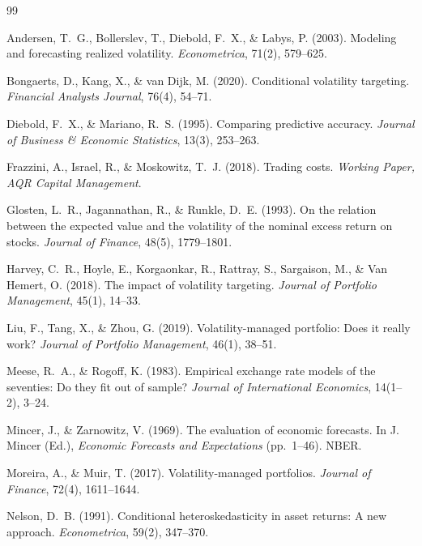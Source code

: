 \documentclass[12pt, a4paper]{article}
\begin{document}

\begin{thebibliography}{99}

Andersen, T.~G., Bollerslev, T., Diebold, F.~X., \& Labys, P. (2003).
Modeling and forecasting realized volatility.
\textit{Econometrica}, 71(2), 579--625.

Bongaerts, D., Kang, X., \& van Dijk, M. (2020).
Conditional volatility targeting.
\textit{Financial Analysts Journal}, 76(4), 54--71.

Diebold, F.~X., \& Mariano, R.~S. (1995).
Comparing predictive accuracy.
\textit{Journal of Business \& Economic Statistics}, 13(3), 253--263.

Frazzini, A., Israel, R., \& Moskowitz, T.~J. (2018).
Trading costs.
\textit{Working Paper, AQR Capital Management}.

Glosten, L.~R., Jagannathan, R., \& Runkle, D.~E. (1993).
On the relation between the expected value and the volatility of the nominal excess
return on stocks.
\textit{Journal of Finance}, 48(5), 1779--1801.

Harvey, C.~R., Hoyle, E., Korgaonkar, R., Rattray, S., Sargaison, M., \&
Van Hemert, O. (2018).
The impact of volatility targeting.
\textit{Journal of Portfolio Management}, 45(1), 14--33.

Liu, F., Tang, X., \& Zhou, G. (2019).
Volatility-managed portfolio: Does it really work?
\textit{Journal of Portfolio Management}, 46(1), 38--51.

Meese, R.~A., \& Rogoff, K. (1983).
Empirical exchange rate models of the seventies: Do they fit out of sample?
\textit{Journal of International Economics}, 14(1--2), 3--24.

Mincer, J., \& Zarnowitz, V. (1969).
The evaluation of economic forecasts.
In J. Mincer (Ed.), \textit{Economic Forecasts and Expectations} (pp.~1--46). NBER.

Moreira, A., \& Muir, T. (2017).
Volatility-managed portfolios.
\textit{Journal of Finance}, 72(4), 1611--1644.

Nelson, D.~B. (1991).
Conditional heteroskedasticity in asset returns: A new approach.
\textit{Econometrica}, 59(2), 347--370.

\end{thebibliography}
\end{document}
